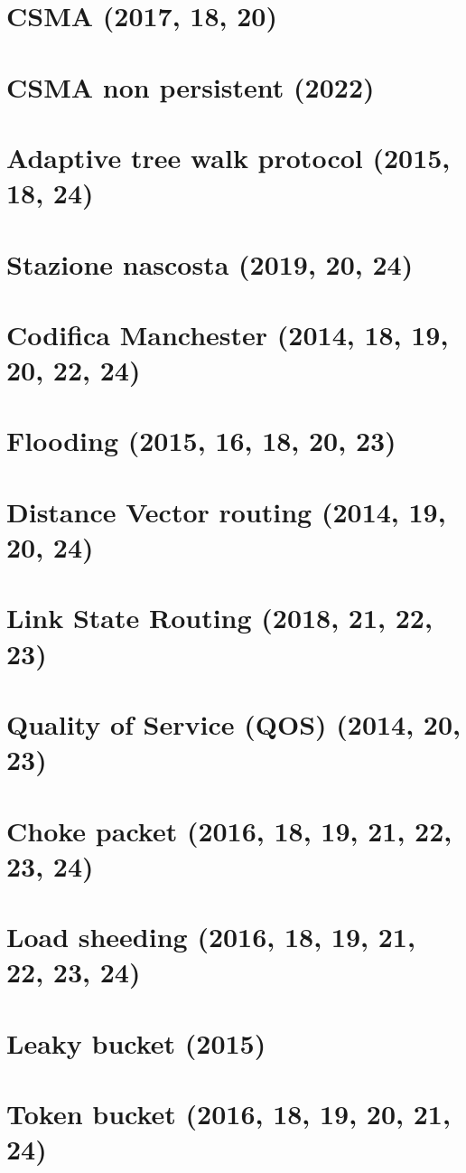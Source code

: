 \documentclass[12pt,oneside,a4paper]{article}
\begin{document}
\section{CSMA (2017, 18, 20)}
\section{CSMA non persistent (2022)}
\section{Adaptive tree walk protocol (2015, 18, 24)}
\section{Stazione nascosta (2019, 20, 24)}
\section{Codifica Manchester (2014, 18, 19, 20, 22, 24)}
\section{Flooding (2015, 16, 18, 20, 23)}
\section{Distance Vector routing (2014, 19, 20, 24)}
\section{Link State Routing (2018, 21, 22, 23)}
\section{Quality of Service (QOS) (2014, 20, 23)}
\section{Choke packet (2016, 18, 19, 21, 22, 23, 24)}
\section{Load sheeding (2016, 18, 19, 21, 22, 23, 24)}
\section{Leaky bucket (2015)}
\section{Token bucket (2016, 18, 19, 20, 21, 24)}
\end{document}
